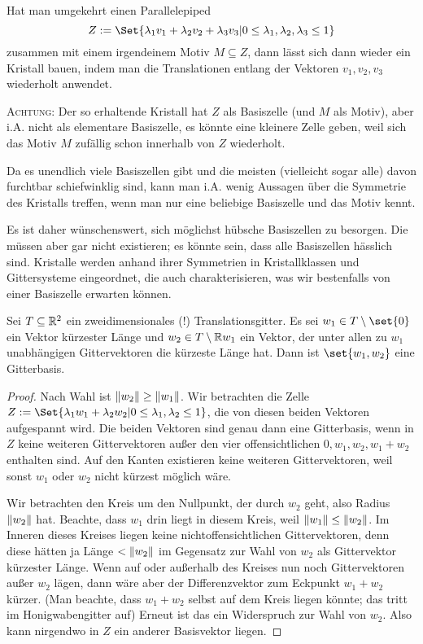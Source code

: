 \begin{remark}
Hat man umgekehrt einen Parallelepiped
\[Z:=\Set{\lambda_1v_1+\lambda_2v_2+\lambda_3v_3 | 0\leq\lambda_1,\lambda_2,\lambda_3\leq 1}\]
zusammen mit einem irgendeinem Motiv $M\subseteq Z$, dann lässt sich dann wieder ein Kristall bauen, indem man die Translationen entlang der Vektoren $v_1,v_2,v_3$ wiederholt anwendet.

\textsc{Achtung}: Der so erhaltende Kristall hat $Z$ als Basiszelle (und $M$ als Motiv), aber i.A. nicht als elementare Basiszelle, es könnte eine kleinere Zelle geben, weil sich das Motiv $M$ zufällig schon innerhalb von $Z$ wiederholt.
\end{remark}

\begin{remark}
Da es unendlich viele Basiszellen gibt und die meisten (vielleicht sogar alle) davon furchtbar schiefwinklig sind, kann man i.A. wenig Aussagen über die Symmetrie des Kristalls treffen, wenn man nur eine beliebige Basiszelle und das Motiv kennt.

Es ist daher wünschenswert, sich möglichst hübsche Basiszellen zu besorgen. Die müssen aber gar nicht existieren; es könnte sein, dass alle Basiszellen hässlich sind. Kristalle werden anhand ihrer Symmetrien in Kristallklassen und Gittersysteme eingeordnet, die auch charakterisieren, was wir bestenfalls von einer Basiszelle erwarten können.
\end{remark}

\begin{lemma}\label{kristalle:gitterbasen_2D_kuerzeste_vektoren}
Sei $T\subseteq\mathbb{R}^2$ ein zweidimensionales (!) Translationsgitter. Es sei $w_1\in T\setminus\set{0}$ ein Vektor kürzester Länge und $w_2\in T \setminus \mathbb{R} w_1$ ein Vektor, der unter allen zu $w_1$ unabhängigen Gittervektoren die kürzeste Länge hat. Dann ist $\set{w_1,w_2}$ eine Gitterbasis.
\end{lemma}
\begin{proof}
Nach Wahl ist $\lVert w_2\rVert\geq\lVert w_1\rVert$. Wir betrachten die Zelle $Z:=\Set{\lambda_1 w_1+ \lambda_2 w_2 | 0\leq \lambda_1,\lambda_2\leq 1}$, die von diesen beiden Vektoren aufgespannt wird. Die beiden Vektoren sind genau dann eine Gitterbasis, wenn in $Z$ keine weiteren Gittervektoren außer den vier offensichtlichen $0,w_1,w_2,w_1+w_2$ enthalten sind. Auf den Kanten existieren keine weiteren Gittervektoren, weil sonst $w_1$ oder $w_2$ nicht kürzest möglich wäre.

Wir betrachten den Kreis um den Nullpunkt, der durch $w_2$ geht, also Radius $\lVert w_2\rVert$ hat. Beachte, dass $w_1$ drin liegt in diesem Kreis, weil $\lVert w_1\rVert\leq \lVert w_2\rVert$. Im Inneren dieses Kreises liegen keine nichtoffensichtlichen Gittervektoren, denn diese hätten ja Länge $<\lVert w_2\rVert$ im Gegensatz zur Wahl von $w_2$ als Gittervektor kürzester Länge. Wenn auf oder außerhalb des Kreises nun noch Gittervektoren außer $w_2$ lägen, dann wäre aber der Differenzvektor zum Eckpunkt $w_1+w_2$ kürzer. (Man beachte, dass $w_1+w_2$ selbst auf dem Kreis liegen könnte; das tritt im Honigwabengitter auf) Erneut ist das ein Widerspruch zur Wahl von $w_2$. Also kann nirgendwo in $Z$ ein anderer Basisvektor liegen.
\end{proof}